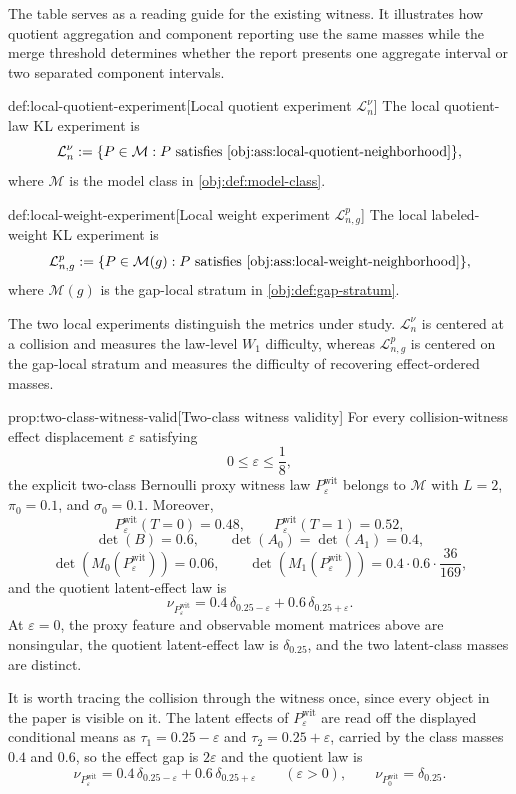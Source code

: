 The table serves as a reading guide for the existing witness. It illustrates how quotient aggregation and component reporting use the same masses while the merge threshold determines whether the report presents one aggregate interval or two separated component intervals.

\begin{definitionv}{def:local-quotient-experiment}[Local quotient experiment \(\mathcal L_n^\nu\)]
The local quotient-law KL experiment is
\[
\mathcal L_n^\nu
:=
\{P\in\mathcal M:P\text{ satisfies }\cref{obj:ass:local-quotient-neighborhood}\},
\]
where \(\mathcal M\) is the model class in \cref{obj:def:model-class}.
\end{definitionv}

\begin{definitionv}{def:local-weight-experiment}[Local weight experiment \(\mathcal L_{n,g}^p\)]
The local labeled-weight KL experiment is
\[
\mathcal L_{n,g}^p
:=
\{P\in\mathcal M(g):P\text{ satisfies }\cref{obj:ass:local-weight-neighborhood}\},
\]
where \(\mathcal M(g)\) is the gap-local stratum in \cref{obj:def:gap-stratum}.
\end{definitionv}

The two local experiments distinguish the metrics under study. \(\mathcal L_n^\nu\) is centered at a collision and measures the law-level \(W_1\) difficulty, whereas \(\mathcal L_{n,g}^p\) is centered on the gap-local stratum and measures the difficulty of recovering effect-ordered masses.

\begin{propositionv}{prop:two-class-witness-valid}[Two-class witness validity]
For every collision-witness effect displacement \(\varepsilon\) satisfying
\[
0\le \varepsilon \le \frac18,
\]
the explicit two-class Bernoulli proxy witness law \(P_{\varepsilon}^{\mathrm{wit}}\) belongs to \(\mathcal M\) with \(L=2\), \(\pi_0=0.1\), and \(\sigma_0=0.1\). Moreover,
\[
P_{\varepsilon}^{\mathrm{wit}}(T=0)=0.48,\qquad
P_{\varepsilon}^{\mathrm{wit}}(T=1)=0.52,
\]
\[
\det(B)=0.6,\qquad
\det(A_0)=\det(A_1)=0.4,
\]
\[
\det(M_0(P_{\varepsilon}^{\mathrm{wit}}))=0.06,\qquad
\det(M_1(P_{\varepsilon}^{\mathrm{wit}}))=0.4\cdot 0.6\cdot \frac{36}{169},
\]
and the quotient latent-effect law is
\[
\nu_{P_{\varepsilon}^{\mathrm{wit}}}
=
0.4\,\delta_{0.25-\varepsilon}
+
0.6\,\delta_{0.25+\varepsilon}.
\]
At \(\varepsilon=0\), the proxy feature and observable moment matrices above are nonsingular, the quotient latent-effect law is \(\delta_{0.25}\), and the two latent-class masses are distinct.
\end{propositionv}
It is worth tracing the collision through the witness once, since every object in the paper is visible on it. The latent effects of \(P_{\varepsilon}^{\mathrm{wit}}\) are read off the displayed conditional means as \(\tau_1=0.25-\varepsilon\) and \(\tau_2=0.25+\varepsilon\), carried by the class masses \(0.4\) and \(0.6\), so the effect gap is \(2\varepsilon\) and the quotient law is
\[
\nu_{P^{\mathrm{wit}}_{\varepsilon}}=0.4\,\delta_{0.25-\varepsilon}+0.6\,\delta_{0.25+\varepsilon}
\qquad(\varepsilon>0),
\qquad
\nu_{P^{\mathrm{wit}}_{0}}=\delta_{0.25}.
\]

